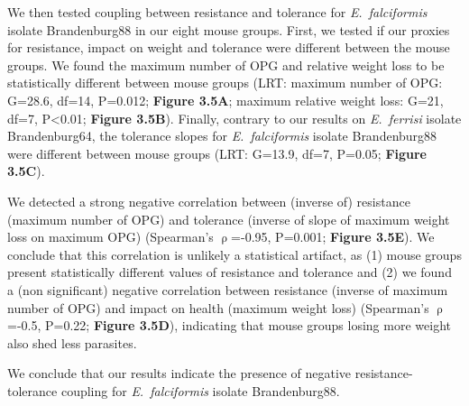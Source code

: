 We then tested coupling between resistance and tolerance for \textit{E.~falciformis} isolate Brandenburg88 in our eight mouse groups. First, we tested if our proxies for resistance, impact on weight and tolerance were different between the mouse groups. We found the maximum number of OPG and relative weight loss to be statistically different between mouse groups (LRT: maximum number of OPG: G=28.6, df=14, P=0.012; \textbf{Figure 3.5A}; maximum relative weight loss: G=21, df=7, P<0.01; \textbf{Figure 3.5B}). Finally, contrary to our results on \textit{E.~ferrisi} isolate Brandenburg64, the tolerance slopes for \textit{E.~falciformis} isolate Brandenburg88 were different between mouse groups (LRT: G=13.9, df=7, P=0.05; \textbf{Figure 3.5C}).\par

We detected a strong negative correlation between (inverse of) resistance (maximum number of OPG) and tolerance (inverse of slope of maximum weight loss on maximum OPG) (Spearman's $\uprho$=-0.95, P=0.001; \textbf{Figure 3.5E}). We conclude that this correlation is unlikely a statistical artifact, as (1) mouse groups present statistically different values of resistance and tolerance and (2) we found a (non significant) negative correlation between resistance (inverse of maximum number of OPG) and impact on health (maximum weight loss) (Spearman's $\uprho$=-0.5, P=0.22; \textbf{Figure 3.5D}), indicating that mouse groups losing more weight also shed less parasites. \par

We conclude that our results indicate the presence of negative resistance-tolerance coupling for \textit{E.~falciformis} isolate Brandenburg88.

